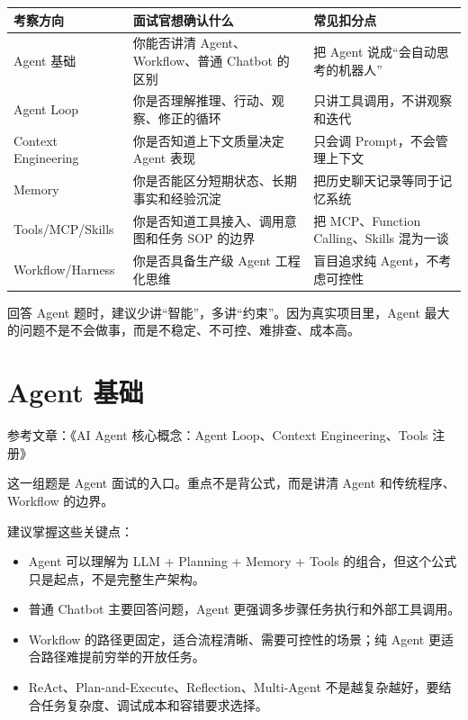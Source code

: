 \documentclass[9pt,a4paper,twocolumn]{ctexart}
\begin{document}
{\footnotesize
\begin{tabular}{|p{}|p{}|p{}|}
\hline
\textbf{考察方向} & \textbf{面试官想确认什么} & \textbf{常见扣分点} \\
\hline
Agent 基础 & 你能否讲清 Agent、Workflow、普通 Chatbot 的区别 & 把 Agent 说成“会自动思考的机器人” \\
\hline
Agent Loop & 你是否理解推理、行动、观察、修正的循环 & 只讲工具调用，不讲观察和迭代 \\
\hline
Context Engineering & 你是否知道上下文质量决定 Agent 表现 & 只会调 Prompt，不会管理上下文 \\
\hline
Memory & 你是否能区分短期状态、长期事实和经验沉淀 & 把历史聊天记录等同于记忆系统 \\
\hline
Tools/MCP/Skills & 你是否知道工具接入、调用意图和任务 SOP 的边界 & 把 MCP、Function Calling、Skills 混为一谈 \\
\hline
Workflow/Harness & 你是否具备生产级 Agent 工程化思维 & 盲目追求纯 Agent，不考虑可控性 \\
\hline
\end{tabular}
}



回答 Agent 题时，建议少讲“智能”，多讲“约束”。因为真实项目里，Agent 最大的问题不是不会做事，而是不稳定、不可控、难排查、成本高。



\section*{Agent 基础}


参考文章：《AI Agent 核心概念：Agent Loop、Context Engineering、Tools 注册》



这一组题是 Agent 面试的入口。重点不是背公式，而是讲清 Agent 和传统程序、Workflow 的边界。



建议掌握这些关键点：


\begin{itemize}[itemsep=1pt, topsep=2pt]
  \item Agent 可以理解为 LLM + Planning + Memory + Tools 的组合，但这个公式只是起点，不是完整生产架构。
  \item 普通 Chatbot 主要回答问题，Agent 更强调多步骤任务执行和外部工具调用。
  \item Workflow 的路径更固定，适合流程清晰、需要可控性的场景；纯 Agent 更适合路径难提前穷举的开放任务。
  \item ReAct、Plan-and-Execute、Reflection、Multi-Agent 不是越复杂越好，要结合任务复杂度、调试成本和容错要求选择。
\end{itemize}
\end{document}
